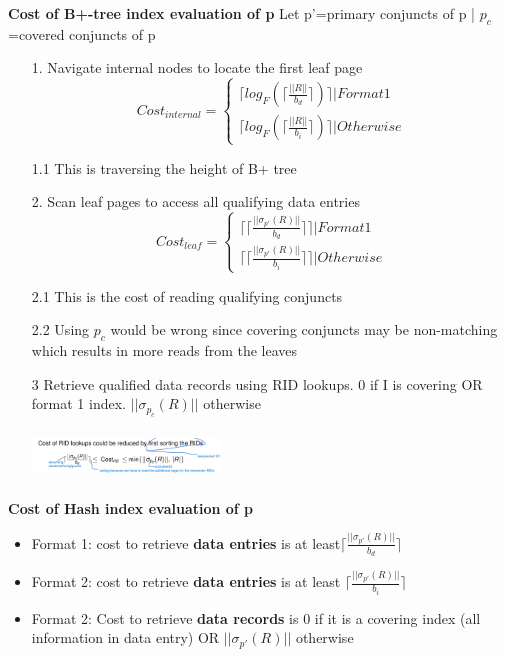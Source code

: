 \documentclass[10pt, landscape]{article}
\newcommand{\ceil}[1]{\lceil #1 \rceil}
\begin{document}
\begin{multicols}{4}
\textbf{Cost of B+-tree index evaluation of p} \newline
Let p'=primary conjuncts of p | $p_c$=covered conjuncts of p \newline
\begin{itemize}
  \item[1.] Navigate internal nodes to locate the first leaf page
  $$
  Cost_{internal} = \left\{
    \begin{array}{ll}
        \ceil{log_F(\ceil{\frac{||R||}{b_d}})} | Format 1 \\
        \ceil{log_F(\ceil{\frac{||R||}{b_i}})} | Otherwise
    \end{array}
\right.
  $$ \newline
  \item[1.1] This is traversing the height of B+ tree
  \item[2.] Scan leaf pages to access all qualifying data entries
  $$
  Cost_{leaf} = \left\{
    \begin{array}{ll}
        \ceil{\ceil{\frac{||\sigma_{p'}(R)||}{b_d}}} | Format 1 \\
        \ceil{\ceil{\frac{||\sigma_{p'}(R)||}{b_i}}} | Otherwise
    \end{array}
\right.
  $$ \newline
  \item[2.1] This is the cost of reading qualifying conjuncts
  \item[2.2] Using $p_c$ would be wrong since covering conjuncts may be non-matching which results in more reads from the leaves 
  \item[3] Retrieve qualified data records using RID lookups. 0 if I is covering OR format 1 index. $||\sigma_{p_c}(R)||$ otherwise
  \item[] \includegraphics[width=5cm, height=1.3cm]{optimisation.png}
\end{itemize}

\textbf{Cost of Hash index evaluation of p}
\begin{itemize}
  \item Format 1: cost to retrieve \textbf{data entries} is at least$\ceil{\frac{||\sigma_{p'}(R)||}{b_d}}$
  \item Format 2: cost to retrieve \textbf{data entries} is at least $\ceil{\frac{||\sigma_{p'}(R)||}{b_i}}$
  \item Format 2: Cost to retrieve \textbf{data records} is 0 if it is a covering index (all information in data entry) OR $||\sigma_{p'}(R)||$ otherwise
\end{itemize}

\end{multicols}
\end{document}
